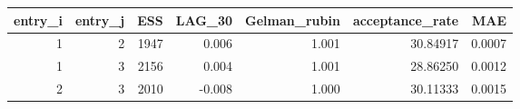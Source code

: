 \begin{longtable}{rrrrrrr}
\toprule
entry\_i & entry\_j & ESS & LAG\_30 & Gelman\_rubin & acceptance\_rate & MAE \\ 
\midrule
1 & 2 & 1947 & 0.006 & 1.001 & 30.84917 & 0.0007 \\ 
1 & 3 & 2156 & 0.004 & 1.001 & 28.86250 & 0.0012 \\ 
2 & 3 & 2010 & -0.008 & 1.000 & 30.11333 & 0.0015 \\ 
\bottomrule
\end{longtable}

